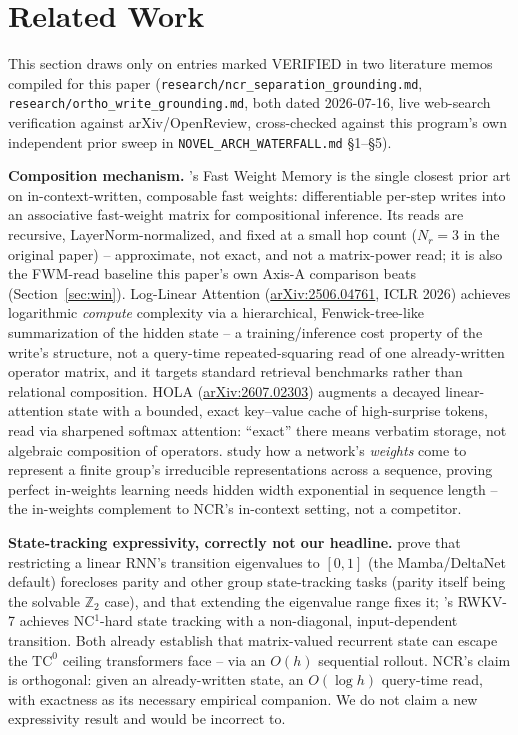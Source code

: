 \section{Related Work}
\label{sec:related}

This section draws only on entries marked VERIFIED in two literature
memos compiled for this paper
(\texttt{research/ncr\_separation\_grounding.md},
\texttt{research/ortho\_write\_grounding.md}, both dated 2026-07-16, live
web-search verification against arXiv/OpenReview, cross-checked against
this program's own independent prior sweep in
\texttt{NOVEL\_ARCH\_WATERFALL.md} \S1--\S5).

\textbf{Composition mechanism.} \citet{schlag2021fwm}'s Fast Weight
Memory is the single closest prior art on in-context-written,
composable fast weights: differentiable per-step writes into an
associative fast-weight matrix for compositional inference. Its reads are
recursive, LayerNorm-normalized, and fixed at a small hop count ($N_r{=}3$
in the original paper) -- approximate, not exact, and not a matrix-power
read; it is also the FWM-read baseline this paper's own Axis-A comparison
beats (Section~\ref{sec:win}). Log-Linear Attention
(\href{https://arxiv.org/abs/2506.04761}{arXiv:2506.04761}, ICLR 2026)
achieves logarithmic \emph{compute} complexity via a hierarchical,
Fenwick-tree-like summarization of the hidden state -- a training/inference
cost property of the write's structure, not a query-time repeated-squaring
read of one already-written operator matrix, and it targets standard
retrieval benchmarks rather than relational composition. HOLA
(\href{https://arxiv.org/abs/2607.02303}{arXiv:2607.02303}) augments a
decayed linear-attention state with a bounded, exact key--value cache of
high-surprise tokens, read via sharpened softmax attention: ``exact''
there means verbatim storage, not algebraic composition of operators.
\citet{marchetti2026sequential} study how a network's \emph{weights} come
to represent a finite group's irreducible representations across a
sequence, proving perfect in-weights learning needs hidden width
exponential in sequence length -- the in-weights complement to NCR's
in-context setting, not a competitor.

\textbf{State-tracking expressivity, correctly not our headline.}
\citet{grazzi2025unlocking} prove that restricting a linear RNN's
transition eigenvalues to $[0,1]$ (the Mamba/DeltaNet default) forecloses
parity and other group state-tracking tasks (parity itself being the
solvable $\mathbb{Z}_2$ case), and that extending the eigenvalue range
fixes it; \citet{peng2025rwkv7}'s RWKV-7 achieves
NC$^1$-hard state tracking with a non-diagonal, input-dependent transition.
Both already establish that matrix-valued recurrent state can escape the
$\mathrm{TC}^0$ ceiling transformers face \citep{merrill2023parallelism} --
via an $O(h)$ sequential rollout. NCR's claim is orthogonal: given an
already-written state, an $O(\log h)$ query-time read, with exactness as
its necessary empirical companion. We do not claim a new expressivity
result and would be incorrect to.

